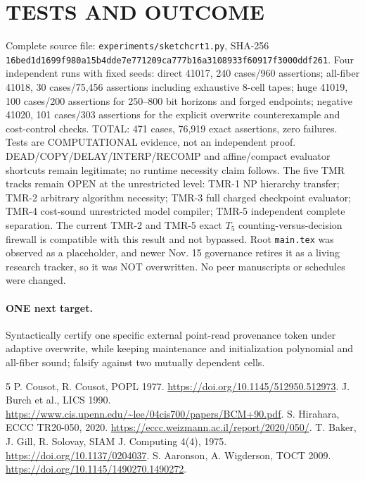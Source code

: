 \documentclass[11pt]{article}
\begin{document}
\section{TESTS AND OUTCOME}
Complete source file: \texttt{experiments/sketchcrt1.py}, SHA-256 \texttt{16bed1d1699f980a15b4dde7e771209ca777b16a3108933f60917f3000ddf261}. Four independent runs with fixed seeds: direct 41017, 240 cases/960 assertions; all-fiber 41018, 30 cases/75,456 assertions including exhaustive 8-cell tapes; huge 41019, 100 cases/200 assertions for 250--800 bit horizons and forged endpoints; negative 41020, 101 cases/303 assertions for the explicit overwrite counterexample and cost-control checks. TOTAL: 471 cases, 76,919 exact assertions, zero failures. Tests are COMPUTATIONAL evidence, not an independent proof. DEAD/COPY/DELAY/INTERP/RECOMP and affine/compact evaluator shortcuts remain legitimate; no runtime necessity claim follows.
The five TMR tracks remain OPEN at the unrestricted level: TMR-1 NP hierarchy transfer; TMR-2 arbitrary algorithm necessity; TMR-3 full charged checkpoint evaluator; TMR-4 cost-sound unrestricted model compiler; TMR-5 independent complete separation. The current TMR-2 and TMR-5 exact $T_5$ counting-versus-decision firewall is compatible with this result and not bypassed. Root \texttt{main.tex} was observed as a placeholder, and newer Nov. 15 governance retires it as a living research tracker, so it was NOT overwritten. No peer manuscripts or schedules were changed.
\paragraph{ONE next target.} Syntactically certify one specific external point-read provenance token under adaptive overwrite, while keeping maintenance and initialization polynomial and all-fiber sound; falsify against two mutually dependent cells.
\begin{thebibliography}{5}
 P. Cousot, R. Cousot, POPL 1977. \url{https://doi.org/10.1145/512950.512973}.
 J. Burch et al., LICS 1990. \url{https://www.cis.upenn.edu/~lee/04cis700/papers/BCM+90.pdf}.
 S. Hirahara, ECCC TR20-050, 2020. \url{https://eccc.weizmann.ac.il/report/2020/050/}.
 T. Baker, J. Gill, R. Solovay, SIAM J. Computing 4(4), 1975. \url{https://doi.org/10.1137/0204037}.
 S. Aaronson, A. Wigderson, TOCT 2009. \url{https://doi.org/10.1145/1490270.1490272}.
\end{thebibliography}
\end{document}
